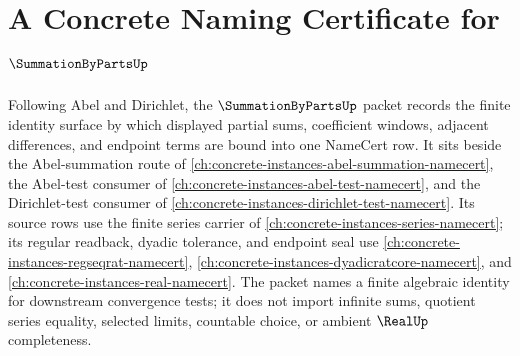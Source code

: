 \chapter{A Concrete Naming Certificate for $\SummationByPartsUp$}
\label{ch:concrete-instances-summation-by-parts-namecert}

Following Abel and Dirichlet, the $\SummationByPartsUp$ packet records the finite identity surface by which displayed partial sums, coefficient windows, adjacent differences, and endpoint terms are bound into one NameCert row. It sits beside the Abel-summation route of \autoref{ch:concrete-instances-abel-summation-namecert}, the Abel-test consumer of \autoref{ch:concrete-instances-abel-test-namecert}, and the Dirichlet-test consumer of \autoref{ch:concrete-instances-dirichlet-test-namecert}. Its source rows use the finite series carrier of \autoref{ch:concrete-instances-series-namecert}; its regular readback, dyadic tolerance, and endpoint seal use \autoref{ch:concrete-instances-regseqrat-namecert}, \autoref{ch:concrete-instances-dyadicratcore-namecert}, and \autoref{ch:concrete-instances-real-namecert}. The packet names a finite algebraic identity for downstream convergence tests; it does not import infinite sums, quotient series equality, selected limits, countable choice, or ambient $\RealUp$ completeness.


